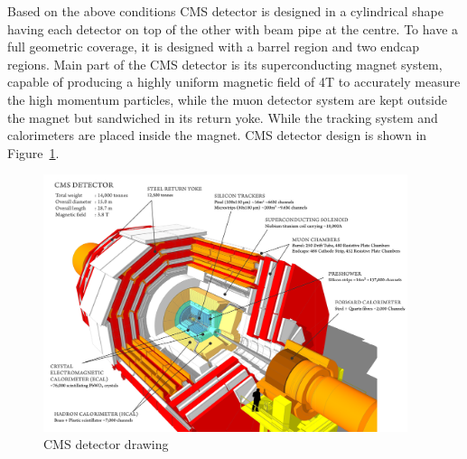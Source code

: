 
Based on the above conditions CMS detector is designed in a cylindrical shape having each detector on top of the other with beam pipe at the centre. To have a full geometric coverage, it is designed with a barrel region and two endcap regions. Main part of the CMS detector is its superconducting magnet system, capable of producing a highly uniform magnetic field of 4T to accurately measure the high momentum particles, while the muon detector system are kept outside the magnet but sandwiched in its return yoke. While the tracking system and calorimeters are placed inside the magnet. CMS detector design is shown in Figure~\ref{fig:CMS-detector}.
\begin{figure}[!htbp]
	\centering
	\includegraphics[width=0.95\textwidth]{figures/LHC/cms_120918_03.png}
	\caption{CMS detector drawing}
	\label{fig:CMS-detector}
\end{figure}

